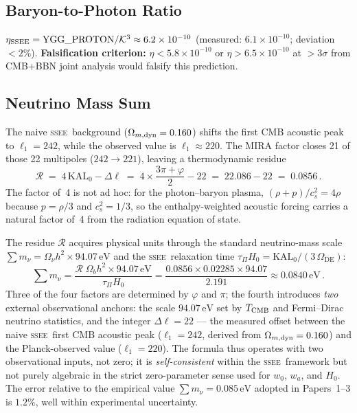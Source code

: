 \documentclass[12pt,a4paper]{article}
\newcommand{\SSEE}{\ifmmode\mathrm{SSEE}\else\textsc{ssee}\fi}
\begin{document}
\subsection{Baryon-to-Photon Ratio}

$\eta_{\rm SSEE} = \mathrm{YGG\_PROTON}/\mathcal{K}^3 \approx 6.2\times10^{-10}$
(measured: $6.1\times10^{-10}$; deviation $<2\%$).
\textbf{Falsification criterion:} $\eta < 5.8\times10^{-10}$ or $\eta > 6.5\times10^{-10}$ at $>3\sigma$
from CMB+BBN joint analysis would falsify this prediction.

\subsection{Neutrino Mass Sum}
\label{sec:neutrino}

The naive \SSEE\ background ($\Omega_{m,\rm dyn}=0.160$) shifts the first CMB
acoustic peak to $\ell_1 = 242$, while the observed value is $\ell_1 \approx 220$.
The MIRA factor closes 21 of those 22 multipoles ($242\to221$), leaving a
thermodynamic residue
\begin{equation}
  \mathcal{R} \;=\; 4\,\mathrm{KAL}_0 - \Delta\ell
               \;=\; 4 \times \frac{3\pi+\varphi}{2} - 22
               \;=\; 22.086 - 22 \;=\; 0.0856\,.
\label{eq:residue}
\end{equation}
The factor of~4 is not ad hoc: for the photon--baryon plasma,
$(\rho+p)/c_s^2 = 4\rho$ because $p=\rho/3$ and $c_s^2 = 1/3$,
so the enthalpy-weighted acoustic forcing carries a natural factor of~4
from the radiation equation of state.

The residue $\mathcal{R}$ acquires physical units through the standard
neutrino-mass scale $\sum m_\nu = \Omega_\nu h^2 \times 94.07\,\mathrm{eV}$
and the \SSEE\ relaxation time $\tau_\Pi H_0 = \mathrm{KAL}_0/(3\,\Omega_\mathrm{DE})$:
\begin{equation}
  \boxed{\sum m_\nu
    = \frac{\mathcal{R}\;\Omega_b h^2 \times 94.07\,\mathrm{eV}}{\tau_\Pi H_0}
    = \frac{0.0856 \times 0.02285 \times 94.07}{2.191}
    \approx 0.0840\,\mathrm{eV}\,.}
\label{eq:mnu}
\end{equation}
Three of the four factors are determined by $\varphi$ and $\pi$; the
fourth introduces \emph{two} external observational anchors: the scale
$94.07\,\mathrm{eV}$ set by $T_{\rm CMB}$ and Fermi--Dirac neutrino
statistics, and the integer $\Delta\ell = 22$ — the measured offset
between the naive \SSEE{}rst CMB acoustic peak ($\ell_1 = 242$,
derived from $\Omega_{m,\rm dyn}=0.160$) and the Planck-observed value
($\ell_1 = 220$).  The formula thus operates with two observational
inputs, not zero; it is \emph{self-consistent} within the \SSEE\
framework but not purely algebraic in the strict zero-parameter sense
used for $w_0$, $w_a$, and $H_0$.
The error relative to the empirical value $\sum m_\nu = 0.085\,\mathrm{eV}$
adopted in Papers~1--3 is $1.2\%$, well within experimental uncertainty.
\end{document}
